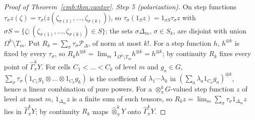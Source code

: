 \documentclass[11pt]{amsart}
\theoremstyle{definition}
\theoremstyle{remark}
\numberwithin{equation}{section}
\theoremstyle{plain}
\theoremstyle{definition}
\theoremstyle{plain}
\newcommand{\hGamma}{\widehat\Gamma}
\newcommand{\cP}{\mathcal P}
\begin{document}
\begin{proof}[Proof of Theorem~\ref{cmb:thm:cantor}]
\emph{Step 5 (polarization).} On step functions $\tau_\sigma z(\zeta)=\tau_\sigma\bigl(z(\zeta_{\sigma(1)},\dots,
\zeta_{\sigma(k)})\bigr)$, so $\tau_\sigma(1_Sz)=1_{\sigma S}\tau_\sigma z$ with
$\sigma S=\{\zeta:(\zeta_{\sigma(1)},\dots,\zeta_{\sigma(k)})\in S\}$; the sets $\sigma\Delta_m$, $\sigma\in S_k$, are
disjoint with union $\Omega^k\setminus T_m$. Put $R_k=\sum_\sigma\tau_\sigma\cP_\Delta$, of norm at most $k!$. For a step
function $h$, $h^{\otimes k}$ is fixed by every $\tau_\sigma$, so
$R_kh^{\otimes k}=\lim_m1_{\Omega^k\setminus T_m}h^{\otimes k}=h^{\otimes k}$; by continuity $R_k$ fixes every point of
$\hGamma^k_\pi Y$. For cells $C_1<\dots<C_k$ of level $m$ and $g_a\in G$,
$\sum_\sigma\tau_\sigma(1_{C_1}g_1\otimes\dots\otimes1_{C_k}g_k)$ is the coefficient of $\lambda_1\cdots\lambda_k$ in
$(\sum_a\lambda_a1_{C_a}g_a)^{\otimes k}$, hence a linear combination of pure powers. For a $\otimes^k_\pi G$-valued step
function $z$ of level at most $m$, $1_{\Delta_m}z$ is a finite sum of such tensors, so
$R_kz=\lim_m\sum_\sigma\tau_\sigma1_{\Delta_m}z$ lies in $\hGamma^k_\pi Y$; by continuity $R_k$ maps
$\widehat\otimes^k_\pi Y$ onto $\hGamma^k_\pi Y$.
\end{proof}
\end{document}
